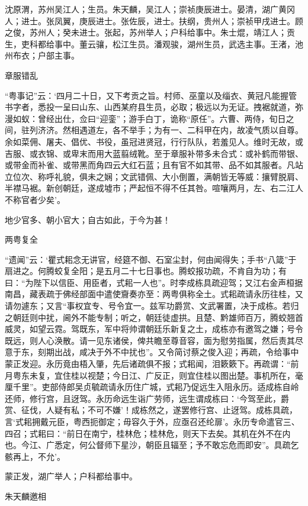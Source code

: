 \documentclass[]{article}
\begin{document}
沈原渭，苏州吴江人；生员。朱天麟，吴江人；崇祯庚辰进士。晏清，湖广黄冈人；进士。张凤翼，庚辰进士。张佐辰，进士。扶纲，贵州人；崇祯甲戌进士。顾之俊，苏州人；癸未进士。张起，苏州举人；户科给事中。朱士焜，靖江人；贡生，吏科都给事中。董云骧，松江生员。潘观骏，湖州生员，武选主事。王渚，池州布衣；户部主事。

章服错乱

``粤事记''云：`四月二十日，又下考贡之旨。村师、巫童以及缁衣、黄冠凡能握管书字者，悉投一呈曰山东、山西某府县生员，必取；极远以为无证。拽裾就道，弥漫如蚁：曾经出仕，佥曰``迎銮''；游手白丁，诡称``原任''。六曹、两侍，旬日之间，驻列济济。然相遇道左，各不举手；为有一、二科甲在内，故凌气质以自尊。余如菜佣、屠夫、倡优、书役，虽冠进贤冠，行行队队，若羞见人。维时无故，或吉服、或衣锦、或卑末而用大蓝翦绒靴。至于章服补带多未合式：或补鹤而带银、或带金而补雀、或带黑而角四云大红石蓝；且有官不如其带、品不如其服者。凡站立位次、称呼礼貌，俱未之娴；文武错佩、大小倒置，满朝皆无等威：攘臂脱肩、半襟马裾。新创朝廷，遂成墟市；严起恒不得不任其咎。喧嚷两月，左、右二江人不称官者少矣'。

地少官多、朝小官大；自古如此，于今为甚！

两粤复全

``遗闻''云：`瞿式耜念无讲官，经筵不御、石室尘封，何由闻得失；手书``八箴''于扇进之。何腾蛟复全阳；是五月二十七日事也。腾蛟报功疏，不肯自为功；有曰：``为陛下以信臣、用臣者，式耜一人也''。时李成栋具疏迎驾；又江右金声桓据南昌，藏表疏于佛经部面中遣使齎奏亦至：两粤俱称全土。式耜疏请永历往桂，又请勿遽东；又言``事权宜专、号令宜一。兹军功爵赏、文武署置，决于成栋。若归之朝廷则中扰，阃外不能专制；听之，朝廷徒虚拱。且楚、黔雄师百万，腾蛟翘首威灵，如望云霓。驾既东，军中将帅谓朝廷乐新复之土，成栋亦有邀驾之嫌；号令既远，则人心涣散。请一见东诸侯，俾共瞻至尊音容，面为慰劳指属，然后责其尽意于东，刻期出战，咸决于外不中扰也''。又令简讨蔡之俊入迎；再疏，令给事中蒙正发迎。永历竟由梧入肇，先后诸疏俱不报；式耜闻，泪簌簌下。再疏谓：``前月粤东未复，宜住桂以视楚；今日江、广反正，则宜住桂以图出楚。事机所在，毫厘千里''。吏部侍郎吴贞毓疏请永历住广城，式耜乃促远生入阻永历。适成栋自岭还师，修行宫，且迓驾。永历命远生诣广劳师，远生谓成栋曰：`今驾至此，爵赏、征伐，人疑有私；不可不嫌'！成栋然之，遂罢修行宫、止迓驾。成栋具疏，言`式耜拥戴元臣，粤西扼御定；毋容久于外，应亟召还纶扉'。永历专命遣官三、四召；式耜曰：``前日在南宁，桂林危；桂林危，则天下去矣。其机在外不在内也。今江、广悉定，何公督师下星沙，朝臣且辐至；予不敢忘危而即安''。具疏乞骸再上，不允'。

蒙正发，湖广举人；户科都给事中。

朱天麟邀相
\end{document}
